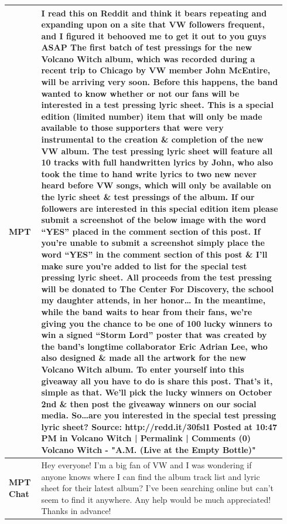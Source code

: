 \documentclass[11pt]{article}
\begin{document}
\begin{table}
\centering 
\small
\begin{tabular}{p{0.11\linewidth}|p{0.83\linewidth}} 
\midrule
\textbf{MPT}&I read this on Reddit and think it bears repeating and expanding upon on a site that VW followers frequent, and I figured it behooved me to get it out to you guys ASAP
The first batch of test pressings for the new Volcano Witch album, which was recorded during a recent trip to Chicago by VW member John McEntire, will be arriving very soon. Before this happens, the band wanted to know whether or not our fans will be interested in a test pressing lyric sheet. This is a special edition (limited number) item that will only be made available to those supporters that were very instrumental to the creation \& completion of the new VW album. The test pressing lyric sheet will feature all 10 tracks with full handwritten lyrics by John, who also took the time to hand write lyrics to two new never heard before VW songs, which will only be available on the lyric sheet \& test pressings of the album. If our followers are interested in this special edition item please submit a screenshot of the below image with the word “YES” placed in the comment section of this post. If you’re unable to submit a screenshot simply place the word “YES” in the comment section of this post \& I’ll make sure you’re added to list for the special test pressing lyric sheet. All proceeds from the test pressing will be donated to The Center For Discovery, the school my daughter attends, in her honor…
In the meantime, while the band waits to hear from their fans, we’re giving you the chance to be one of 100 lucky winners to win a signed “Storm Lord” poster that was created by the band’s longtime collaborator Eric Adrian Lee, who also designed \& made all the artwork for the new Volcano Witch album. To enter yourself into this giveaway all you have to do is share this post. That’s it, simple as that. We’ll pick the lucky winners on October 2nd \& then post the giveaway winners on our social media. So…are you interested in the special test pressing lyric sheet?
Source: http://redd.it/30fsl1
Posted at 10:47 PM in Volcano Witch | Permalink | Comments (0)
Volcano Witch - "A.M. (Live at the Empty Bottle)"\\
\midrule
\textbf{MPT Chat}&Hey everyone! I'm a big fan of VW and I was wondering if anyone knows where I can find the album track list and lyric sheet for their latest album? I've been searching online but can't seem to find it anywhere. Any help would be much appreciated! Thanks in advance!\\

\end{tabular}
\end{table}
\end{document}
